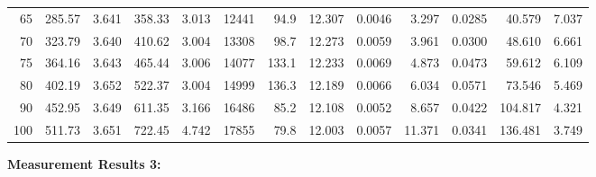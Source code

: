 \documentclass[10pt]{article}
\begin{document}
{\begin{tabular}{|r|rr|rr|rr|rr|rr|r|r|}
       65 &       285.57 &        3.641 &       358.33 &        3.013 &        12441 &         94.9 &       12.307 &       0.0046 &        3.297 &       0.0285 &       40.579 &        7.037 \\
       70 &       323.79 &        3.640 &       410.62 &        3.004 &        13308 &         98.7 &       12.273 &       0.0059 &        3.961 &       0.0300 &       48.610 &        6.661 \\
       75 &       364.16 &        3.643 &       465.44 &        3.006 &        14077 &        133.1 &       12.233 &       0.0069 &        4.873 &       0.0473 &       59.612 &        6.109 \\
       80 &       402.19 &        3.652 &       522.37 &        3.004 &        14999 &        136.3 &       12.189 &       0.0066 &        6.034 &       0.0571 &       73.546 &        5.469 \\
       90 &       452.95 &        3.649 &       611.35 &        3.166 &        16486 &         85.2 &       12.108 &       0.0052 &        8.657 &       0.0422 &      104.817 &        4.321 \\
      100 &       511.73 &        3.651 &       722.45 &        4.742 &        17855 &         79.8 &       12.003 &       0.0057 &       11.371 &       0.0341 &      136.481 &        3.749 \\
\hline
\end{tabular}
}

\vspace{3mm}

\noindent
{\large \bf Measurement Results 3:}
\vspace{3mm}
\end{document}
